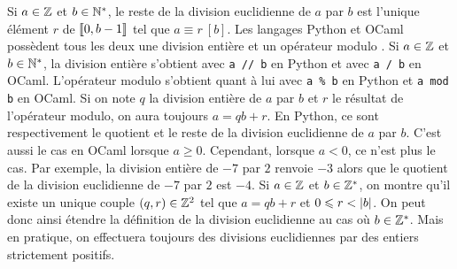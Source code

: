 \documentclass{magnolia}
\begin{document}
\begin{remarques}
\remarque Si $a\in\mathbb{Z}$ et $b\in{\mathbb{N}^*}$, le reste de la division euclidienne de $a$
  par $b$ est l'unique élément $r$ de $\left\llbracket 0,b-1\right\rrbracket$ tel que
  $a\equiv r\ [b]$.
\remarque Les langages Python et OCaml possèdent tous les deux une division entière
  et un opérateur \og modulo \fg. Si $a\in\mathbb{Z}$ et $b\in{\mathbb{N}^*}$, la division entière
  s'obtient avec \verb_a // b_ en Python et avec \verb_a / b_ en OCaml. L'opérateur
  \og modulo \fg s'obtient quant à lui avec \verb_a % b_ en Python et
  \verb_a mod b_ en OCaml. Si on note $q$ la division entière de $a$ par $b$ et $r$
  le résultat de l'opérateur modulo, on aura toujours $a=qb+r$. En Python, ce sont respectivement le quotient
  et le reste de la division euclidienne de $a$ par $b$. C'est aussi le cas en OCaml lorsque $a\geq 0$. 
  Cependant, lorsque $a<0$, ce n'est
  plus le cas. Par exemple, la division entière de $-7$ par $2$ renvoie $-3$ alors que le quotient de
  la division euclidienne de $-7$ par $2$ est $-4$.
\remarque Si $a\in\mathbb{Z}$ et $b\in\mathbb{Z}^*$, on montre qu'il existe un unique couple $\left(q,r\right)\in\mathbb{Z}^2$
  tel que $a=qb+r$ et $0\leqslant r<\left|b\right|$. On peut donc ainsi étendre la définition
  de la division euclidienne au cas où $b\in\mathbb{Z}^*$. Mais en pratique, on effectuera
  toujours des divisions euclidiennes par des entiers strictement positifs.
\end{remarques}
\end{document}
